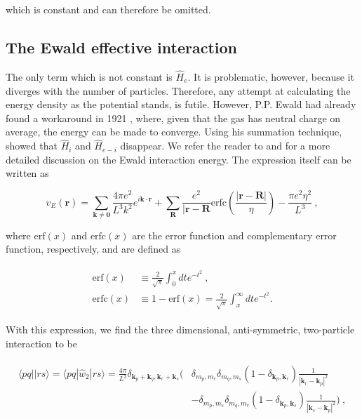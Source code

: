 \documentclass[10pt,twoside]{report}
\begin{document}
	\noindent which is constant and can therefore be omitted.
	
	\subsection{The Ewald effective interaction}
	
	The only term which is not constant is $\hat{H}_e$. It is problematic, however, because it diverges with the number of particles. Therefore, any attempt at calculating the energy density as the potential stands, is futile. However, P.P. Ewald had already found a workaround in 1921 \cite{Ewald21}, where, given that the gas has neutral charge on average, the energy can be made to converge. Using his summation technique, \cite{FraserFoulkesRajagopalNeedsKennyWilliamson95} showed that $\hat{H}_{i}$ and $\hat{H}_{e-i}$ disappear. We refer the reader to \cite{Hansen15} and \cite{Baardsen14} for a more detailed discussion on the Ewald interaction energy. The expression itself can be written as \cite{DrummondNeedsSorouriFoulkes08}
	
	\begin{equation}
	v_E(\bm{r}) = \sum_{\bm{k}\neq \bm{0}}\frac{4\pi e^2}{L^3k^2}e^{i\bm{k}\cdot\bm{r}} + \sum_{\bm{R}} \frac{e^2}{|\bm{r}-\bm{R}}\text{erfc}\left(\frac{|\bm{r}-\bm{R}|}{\eta}\right) - \frac{\pi e^2\eta^2}{L^3} \:,
	\end{equation}
	
	\noindent where $\text{erf}(x)$ and $\text{erfc}(x)$ are the error function and complementary error function, respectively, and are defined as
	
	\begin{align}
		\begin{split}
		\text{erf}(x) &\equiv \frac{2}{\sqrt{\pi}}\int_0^x dte^{-t^2}\:,\\
		\text{erfc}(x) &\equiv 1-\text{erf}(x) =  \frac{2}{\sqrt{\pi}}\int_x^\infty dte^{-t^2} .
		\end{split}
	\end{align}
	
	With this expression, we find the three dimensional, anti-symmetric, two-particle interaction to be \cite{Baardsen14}
	
	\begin{align}
		\begin{split}
		\langle pq||rs\rangle = \langle pq|\hat{w}_2|rs\rangle = \frac{4\pi}{L^3}\delta_{\bm{k}_p+\bm{k}_q,\bm{k}_r+\bm{k}_s}\Bigg(&\delta_{m_p,m_r}\delta_{m_q,m_s}(1-\delta_{\bm{k}_p,\bm{k}_r})\frac{1}{|\bm{k}_r-\bm{k}_p|^2}\\
		&- \delta_{m_p,m_s}\delta_{m_q,m_r}(1-\delta_{\bm{k}_p,\bm{k}_s})\frac{1}{|\bm{k}_s-\bm{k}_p|^2} \Bigg) \:,
		\end{split}
		\label{MBQM | eq | "Ewald energy"}
	\end{align}
	
\end{document}
